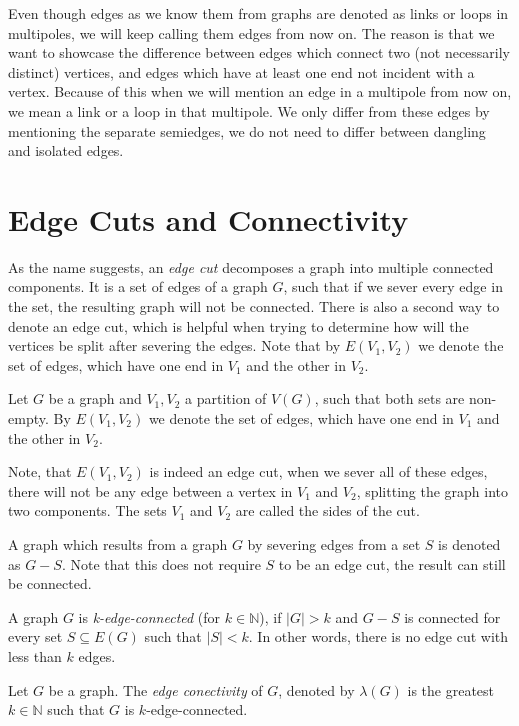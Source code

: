 \documentclass[12pt, twoside]{book}
\begin{document}
Even though edges as we know them from graphs are denoted as links or loops in multipoles, we will keep calling them edges from now on. The reason is that we want to showcase the difference between edges which connect two (not necessarily distinct) vertices, and edges which have at least one end not incident with a vertex. Because of this when we will mention an edge in a multipole from now on, we mean a link or a loop in that multipole. We only differ from these edges by mentioning the separate semiedges, we do not need to differ between dangling and isolated edges.

\section{Edge Cuts and Connectivity}\label{sec:edge-cuts}

As the name suggests, an \textit{edge cut} decomposes a graph into multiple connected components. It is a set of edges of a graph $G$, such that if we sever every edge in the set, the resulting graph will not be connected. There is also a second way to denote an edge cut, which is helpful when trying to determine how will the vertices be split after severing the edges. Note that by $E(V_1,V_2)$ we denote the set of edges, which have one end in $V_1$ and the other in $V_2$.

Let $G$ be a graph and ${V_1,V_2}$ a partition of $V(G)$, such that both sets are non-empty. By $E(V_1,V_2)$ we denote the set of edges, which have one end in $V_1$ and the other in $V_2$.

Note, that $E(V_1,V_2)$ is indeed an edge cut, when we sever all of these edges, there will not be any edge between a vertex in $V_1$ and $V_2$, splitting the graph into two components. The sets $V_1$ and $V_2$ are called the sides of the cut.

A graph which results from a graph $G$ by severing edges from a set $S$ is denoted as $G-S$. Note that this does not require $S$ to be an edge cut, the result can still be connected.

A graph $G$ is \textit{k-edge-connected} (for $k\in\mathbb{N}$), if $|G|>k$ and $G-S$ is connected for every set $S\subseteq E(G)$ such that $|S|<k$. In other words, there is no edge cut with less than $k$ edges.

\begin{definition}
	Let $G$ be a graph. The \textit{edge conectivity} of $G$, denoted by $\lambda(G)$ is the greatest $k\in\mathbb{N}$ such that $G$ is $k$-edge-connected.
\end{definition}
\end{document}
